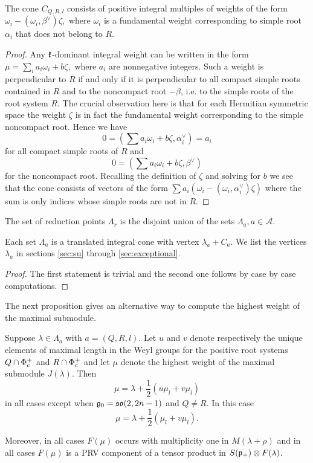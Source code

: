 \begin{lemma}
The cone $C_{Q, R, l}$ consists of positive integral multiples of weights of the form $\omega_i - (\omega_i, \beta^\vee) \zeta,$ where $\omega_i$ is a fundamental weight corresponding to simple root $\alpha_i$ that does not belong to $R$.
\end{lemma}
\begin{proof}
 Any  $\mathfrak{k}$-dominant integral weight can be written in the form $\mu = \sum_i a_i \omega_i + b \zeta,$ where $a_i$ are nonnegative integers. Such a weight is perpendicular to $R$ if and only if it is perpendicular to all compact simple roots contained in $R$ and to the noncompact root $-\beta$, i.e. to the simple roots of the root system $R$. The crucial observation here is that for each Hermitian symmetric space the weight $\zeta$ is in fact the fundamental weight corresponding to the simple noncompact root. Hence we have 
\[
0 = \left(\sum a_i \omega_i + b \zeta, \alpha_i^\vee \right) = a_i 
\] 
for all compact simple roots of  $R$ and 
\[
0 = \left(\sum a_i \omega_i + b \zeta, \beta^\vee \right)
\]
for the noncompact root. Recalling the definition of $\zeta$ and solving for $b$ we see that the cone consists of vectors of the form $\sum a_i (\omega_i - (\omega_i, \alpha_i^\vee)\zeta)$ where the sum is only indices whose simple roots are not in $R$.
\end{proof}

\begin{proposition}
 The set of reduction points $\Lambda_r$ is the disjoint union of the sets $\Lambda_a, a\in\mathcal{A}$.

 Each set $\Lambda_a$ is a translated integral cone with vertex $\lambda_a + C_a$. We list the vertices $\lambda_a$ in sections \ref{sec:su} through \ref{sec:exceptional}.
\end{proposition}
\begin{proof}
 The first statement is trivial and the second one follows by case by case computations.
\end{proof}

The next proposition gives an alternative way to compute the highest weight of the maximal submodule.

\begin{proposition}
 Suppose $\lambda\in\Lambda_a$ with $a=(Q,R,l)$. Let $u$ and $v$ denote respectively the unique elements of maximal length in the Weyl groups for the positive root systems $Q\cap \Phi^+_c$ and $R\cap \Phi^+_c$ and let $\mu$ denote the highest weight of the maximal submodule $J(\lambda)$. Then
 \[
  \mu = \lambda + \frac{1}{2}(u \mu_l + v \mu_l)
 \]
 in all cases except when $\mathfrak{g}_0=\mathfrak{so}(2,2n-1)$ and $Q\neq R$. In this case
 \[
  \mu = \lambda + \frac{1}{2}(\mu_l + v\mu_l).
 \]

 Moreover, in all cases $F(\mu)$ occurs with multiplicity one in $M(\lambda+\rho)$ and in all cases $F(\mu)$ is a PRV component of a tensor product in $S(\mathfrak{p}_+)\otimes F(\lambda)$.
\end{proposition}

